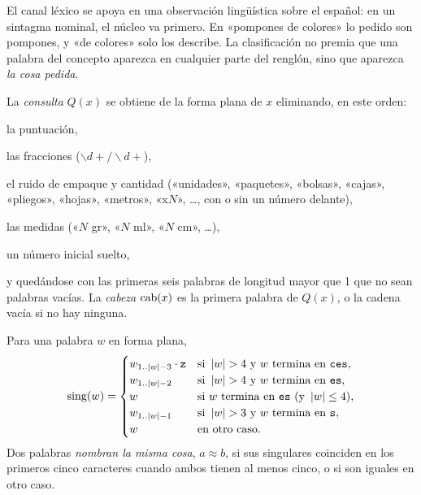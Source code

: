 El canal léxico se apoya en una observación lingüística sobre el español: en
un sintagma nominal, el núcleo va primero. En «pompones de colores» lo pedido
son pompones, y «de colores» solo los describe. La clasificación no premia que
una palabra del concepto aparezca en cualquier parte del renglón, sino que
aparezca \emph{la cosa pedida}.

\begin{definicion}
\label{def:cabeza}
La \emph{consulta} $Q(x)$ se obtiene de la forma plana de $x$ eliminando, en
este orden:
\begin{enumerate*}[label=(\roman*)]
  \item la puntuación,
  \item las fracciones ($\backslash d+/\backslash d+$),
  \item el ruido de empaque y cantidad («unidades», «paquetes», «bolsas»,
        «cajas», «pliegos», «hojas», «metros», «x$N$», \dots, con o sin un
        número delante),
  \item las medidas («$N$ gr», «$N$ ml», «$N$ cm», \dots),
  \item un número inicial suelto,
\end{enumerate*}
y quedándose con las primeras seis palabras de longitud mayor que 1 que no
sean palabras vacías. La \emph{cabeza} $\operatorname{cab}(x)$ es la primera palabra de
$Q(x)$, o la cadena vacía si no hay ninguna.
\end{definicion}

\begin{definicion}[Singular]
\label{def:singular}
Para una palabra $w$ en forma plana,
\[
  \operatorname{sing}(w)=\begin{cases}
    w_{1..\left\lvert w \right\rvert-3}\cdot\texttt{z} & \text{si } \left\lvert w \right\rvert>4 \text{ y } w \text{ termina en } \texttt{ces},\\
    w_{1..\left\lvert w \right\rvert-2} & \text{si } \left\lvert w \right\rvert>4 \text{ y } w \text{ termina en } \texttt{es},\\
    w & \text{si } w \text{ termina en } \texttt{es} \text{ (y } \left\lvert w \right\rvert\leq4\text{)},\\
    w_{1..\left\lvert w \right\rvert-1} & \text{si } \left\lvert w \right\rvert>3 \text{ y } w \text{ termina en } \texttt{s},\\
    w & \text{en otro caso.}
  \end{cases}
\]
Dos palabras \emph{nombran la misma cosa}, $a\approx b$, si sus singulares
coinciden en los primeros cinco caracteres cuando ambos tienen al menos cinco,
o si son iguales en otro caso.
\end{definicion}

